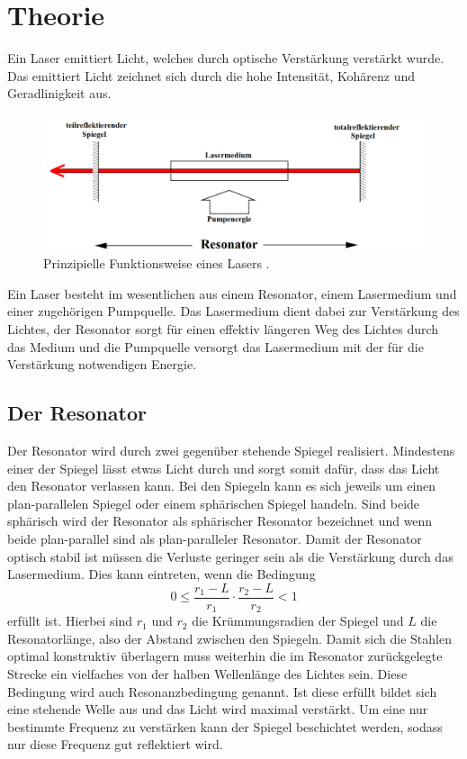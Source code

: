 
\section{Theorie}
\label{sec:Theorie}

Ein Laser emittiert Licht, welches durch optische Verstärkung verstärkt wurde. Das emittiert Licht zeichnet sich durch die hohe Intensität, Kohärenz und Geradlinigkeit aus.

\begin{figure}
	\centering
	\includegraphics[width=\linewidth-100pt,height=\textheight-100pt,keepaspectratio]{content/Images/schema.png}
	\caption{Prinzipielle Funktionsweise eines Lasers \cite{V61}.}
\end{figure}
Ein Laser besteht im wesentlichen aus einem Resonator, einem Lasermedium und einer zugehörigen Pumpquelle. Das Lasermedium dient dabei zur Verstärkung des Lichtes, der Resonator sorgt für einen effektiv längeren Weg des Lichtes durch das Medium und die Pumpquelle versorgt das Lasermedium mit der für die Verstärkung notwendigen Energie. 

\subsection{Der Resonator}
Der Resonator wird durch zwei gegenüber stehende Spiegel realisiert. Mindestens einer der Spiegel lässt etwas Licht durch und sorgt somit dafür, dass das Licht den Resonator verlassen kann. Bei den Spiegeln kann es sich jeweils um einen plan-parallelen Spiegel oder einem sphärischen Spiegel handeln. Sind beide sphärisch wird der Resonator als sphärischer Resonator bezeichnet und wenn beide plan-parallel sind als plan-paralleler Resonator. Damit der Resonator optisch stabil ist müssen die Verluste geringer sein als die Verstärkung durch das Lasermedium. Dies kann eintreten, wenn die Bedingung
\begin{equation}
	0 \leq \frac{r_1 -L}{r_1} \cdot \frac{r_2 -L}{r_2} < 1 \label{eq:stabil}
\end{equation}
erfüllt ist. Hierbei sind $r_1$ und $r_2$ die Krümmungsradien der Spiegel und $L$ die Resonatorlänge, also der Abstand zwischen den Spiegeln. Damit sich die Stahlen optimal konstruktiv überlagern muss weiterhin die im Resonator zurückgelegte Strecke ein vielfaches von der halben Wellenlänge des Lichtes sein. Diese Bedingung wird auch Resonanzbedingung genannt. Ist diese erfüllt bildet sich eine stehende Welle aus und das Licht wird maximal verstärkt. Um eine nur bestimmte Frequenz zu verstärken kann der Spiegel beschichtet werden, sodass nur diese Frequenz gut reflektiert wird.

